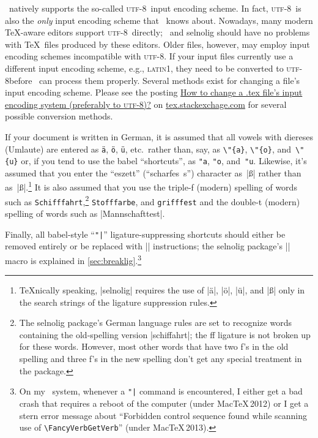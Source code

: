 \documentclass[11pt]{article}
\newcommand{\pkg}[1]{\textsf{#1}}
\newcommand{\cmmd}[1]{\texttt{\textbackslash #1}}
\newcommand\utf{\textsc{utf-8}}
\begin{document}
\LuaLaTeX\ natively supports the so-called \utf\ input encoding scheme. In fact, \utf\ is also the \emph{only} input encoding scheme that \LuaLaTeX\ knows about.  Nowadays, many modern \TeX-aware editors support \utf\ directly; \LuaLaTeX\  and \pkg{selnolig} should have no problems with \TeX\ files produced by these editors. Older files, however, may employ input encoding schemes incompatible with \utf. If your input files currently use a different input encoding scheme, e.g., \textsc{latin1}, they need to be converted to \utf before \LuaLaTeX\ can process them properly. Several methods exist for changing a file's input encoding scheme. Please see the posting \href{http://tex.stackexchange.com/q/87406/5001}{How to change a .tex file's input encoding system (preferably to \utf)?} on \href{http://tex.stackexchange.com/}{tex.stackexchage.com} for several possible conversion methods.

If your document is written in German, it is assumed that all vowels with diereses (Umlaute) are entered as \Verb|ä|, \Verb|ö|, \Verb|ü|, etc.\ rather than, say, as \Verb|\"{a}|, \Verb|\"{o}|, and~\Verb|\"{u}| or, if you tend to use the \pkg{babel} \enquote{shortcuts}, as \Verb|"a|, \Verb|"o|, and~\Verb|"u|. Likewise, it's assumed that you enter the \enquote{eszett} (\enquote{scharfes~s}) character as~|ß| rather than as~|\ss|.\footnote{\TeX nically speaking, |selnolig| requires the use of |ä|, |ö|, |ü|, and |ß| only in the search strings of the ligature suppression rules.} It is also assumed that you use the triple-f (modern) spelling of words such as \texttt{Schifffahrt},\footnote{The \pkg{selnolig} package's German language rules are set to recognize words containing the old-spelling version |schiffahrt|; the ff ligature is not broken up for these words. However, most other words that have two f's in the old spelling and three f's in the new spelling don't get any special treatment in the package.} \texttt{Stofffarbe}, and \texttt{grifffest} and the double-t (modern) spelling of words such as |Mannschafttest|.

Finally, all \pkg{babel}-style ``\Verb+"|+'' ligature-suppressing shortcuts should either be removed entirely or be replaced with |\breaklig| instructions; the \pkg{selnolig} package's |\breaklig| macro is explained in \cref{sec:breaklig}.\footnote{On my \LuaLaTeX\ system, whenever a \Verb+"|+ command is encountered, I either get a bad crash that requires a reboot of the computer (under Mac\TeX\,2012) or I get a stern error message about \enquote{Forbidden control sequence found while scanning use of \cmmd{FancyVerbGetVerb}} (under Mac\TeX\,2013).}
\end{document}
